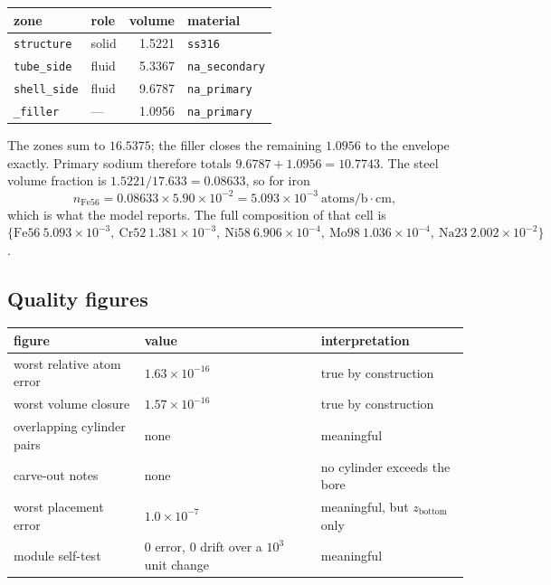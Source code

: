 \documentclass[9pt,a4paper]{extarticle}
\newcommand{\code}[1]{\texttt{\small #1}}
\begin{document}
\begin{center}
\begin{tabular}{@{}llrl@{}}
\toprule
zone & role & volume & material \\
\midrule
\code{structure}  & solid & 1.5221 & \code{ss316} \\
\code{tube\_side} & fluid & 5.3367 & \code{na\_secondary} \\
\code{shell\_side}& fluid & 9.6787 & \code{na\_primary} \\
\midrule
\code{\_filler}   & ---   & 1.0956 & \code{na\_primary} \\
\bottomrule
\end{tabular}
\end{center}

\noindent
The zones sum to $16.5375$; the filler closes the remaining $1.0956$ to the
envelope exactly. Primary sodium therefore totals $9.6787+1.0956=10.7743$. The
steel volume fraction is $1.5221/17.633 = 0.08633$, so for iron
\[
n_{\mathrm{Fe56}} = 0.08633 \times 5.90\times10^{-2}
                  = 5.093\times10^{-3}\ \text{atoms/b}\cdot\text{cm},
\]
which is what the model reports. The full composition of that cell is
$\{\mathrm{Fe56}\ 5.093\!\times\!10^{-3},\ \mathrm{Cr52}\ 1.381\!\times\!10^{-3},\
\mathrm{Ni58}\ 6.906\!\times\!10^{-4},\ \mathrm{Mo98}\ 1.036\!\times\!10^{-4},\
\mathrm{Na23}\ 2.002\!\times\!10^{-2}\}$.

\subsection{Quality figures}

\begin{center}
\begin{tabular}{@{}lll@{}}
\toprule
figure & value & interpretation \\
\midrule
worst relative atom error & $1.63\times10^{-16}$ & true by construction \\
worst volume closure      & $1.57\times10^{-16}$ & true by construction \\
overlapping cylinder pairs& none & meaningful \\
carve-out notes           & none & no cylinder exceeds the bore \\
worst placement error     & $1.0\times10^{-7}$ & meaningful, but $z_{\mathrm{bottom}}$ only \\
module self-test          & $0$ error, $0$ drift over a $10^3$ unit change & meaningful \\
\bottomrule
\end{tabular}
\end{center}
\end{document}
